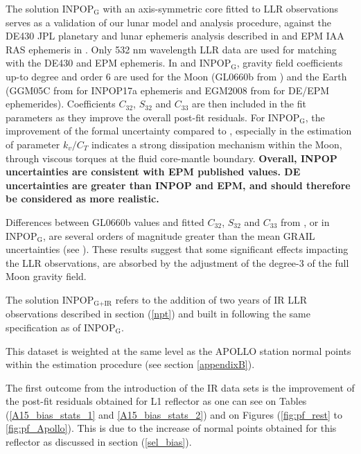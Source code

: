 \documentclass[fleqn,usenatbib,referee]{mnras}
\begin{document}
  The solution INPOP$_{\textrm{G}}$ with an axis-symmetric core fitted to LLR observations serves as a validation of our lunar model and analysis procedure, against the DE430 JPL planetary and lunar ephemeris analysis described in \cite{Folkner2014} and EPM IAA RAS ephemeris in \cite{Pavlov2016}. Only 532 nm wavelength LLR data are used for matching with the DE430 and EPM ephemeris. 
  In \cite{Folkner2014,Pavlov2016} and INPOP$_{\textrm{G}}$, gravity field coefficients up-to degree and order 6 are used for the Moon (GL0660b from \cite{Konopliv2013}) and the Earth (GGM05C from \cite{Ries2016} for INPOP17a ephemeris and EGM2008 from \cite{Pavlis2012,Pavlis2013} for DE/EPM ephemerides). Coefficients $C_{32}$, $S_{32}$ and $C_{33}$ are then included in the fit parameters as they improve the overall post-fit residuals. 
  For INPOP$_{\textrm{G}}$, the improvement of the formal uncertainty compared to \cite{Pavlov2016}, especially in the estimation of parameter $k_v/C_T$ indicates a strong dissipation mechanism within the Moon, through viscous torques at the fluid core-mantle boundary. \textbf{Overall, INPOP uncertainties are consistent with EPM \cite[]{Pavlov2016} published values. DE \cite[]{williams2013de430,Folkner2014} uncertainties are greater than INPOP and EPM, and should therefore be considered as more realistic.}
  
  Differences between GL0660b values and fitted $C_{32}$, $S_{32}$ and $C_{33}$ from \cite{Folkner2014}, \cite{Pavlov2016} or in INPOP$_{\textrm{G}}$, are several orders of magnitude greater than the mean GRAIL uncertainties (see \cite{Konopliv2013}). These results suggest that some significant effects impacting the LLR observations, are absorbed by the adjustment of the degree-3 of the full Moon gravity field.
  
  The solution INPOP$_{\textrm{G+IR}}$ refers to the addition of two years of IR LLR observations \cite[]{Courde2017} described in section (\ref{npt}) and built in following the same specification as of INPOP$_{\textrm{G}}$. 
 
  This dataset is weighted at the same level as the APOLLO station normal points within the estimation procedure (see section \ref{appendixB}).

  The first outcome from the introduction of the IR data sets is the improvement of the post-fit residuals obtained for L1 reflector as one can see on Tables (\ref{A15_bias_stats_1} and \ref{A15_bias_stats_2}) and on Figures (\ref{fig:pf_rest} to \ref{fig:pf_Apollo}). This is due to the increase of normal points obtained for this reflector as discussed in section (\ref{sel_bias}). 
\end{document}
